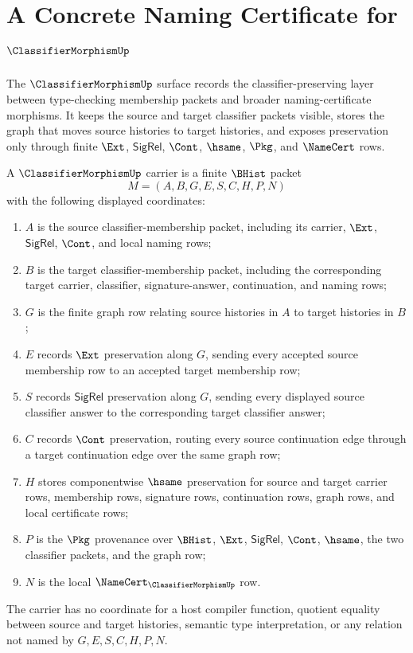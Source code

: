 \chapter{A Concrete Naming Certificate for $\ClassifierMorphismUp$}
\label{ch:concrete-instances-classifiermorphism-namecert}

The $\ClassifierMorphismUp$ surface records the classifier-preserving layer between type-checking membership packets and broader naming-certificate morphisms. It keeps the source and target classifier packets visible, stores the graph that moves source histories to target histories, and exposes preservation only through finite $\Ext$, $\mathsf{SigRel}$, $\Cont$, $\hsame$, $\Pkg$, and $\NameCert$ rows.

\begin{definition}
\label{def:classifiermorphism-carrier}
A $\ClassifierMorphismUp$ carrier is a finite $\BHist$ packet
$$
M=(A,B,G,E,S,C,H,P,N)
$$
with the following displayed coordinates:
\begin{enumerate}
\item $A$ is the source classifier-membership packet, including its carrier, $\Ext$, $\mathsf{SigRel}$, $\Cont$, and local naming rows;
\item $B$ is the target classifier-membership packet, including the corresponding target carrier, classifier, signature-answer, continuation, and naming rows;
\item $G$ is the finite graph row relating source histories in $A$ to target histories in $B$;
\item $E$ records $\Ext$ preservation along $G$, sending every accepted source membership row to an accepted target membership row;
\item $S$ records $\mathsf{SigRel}$ preservation along $G$, sending every displayed source classifier answer to the corresponding target classifier answer;
\item $C$ records $\Cont$ preservation, routing every source continuation edge through a target continuation edge over the same graph row;
\item $H$ stores componentwise $\hsame$ preservation for source and target carrier rows, membership rows, signature rows, continuation rows, graph rows, and local certificate rows;
\item $P$ is the $\Pkg$ provenance over $\BHist$, $\Ext$, $\mathsf{SigRel}$, $\Cont$, $\hsame$, the two classifier packets, and the graph row;
\item $N$ is the local $\NameCert_{\ClassifierMorphismUp}$ row.
\end{enumerate}
The carrier has no coordinate for a host compiler function, quotient equality between source and target histories, semantic type interpretation, or any relation not named by $G,E,S,C,H,P,N$.
\end{definition}

